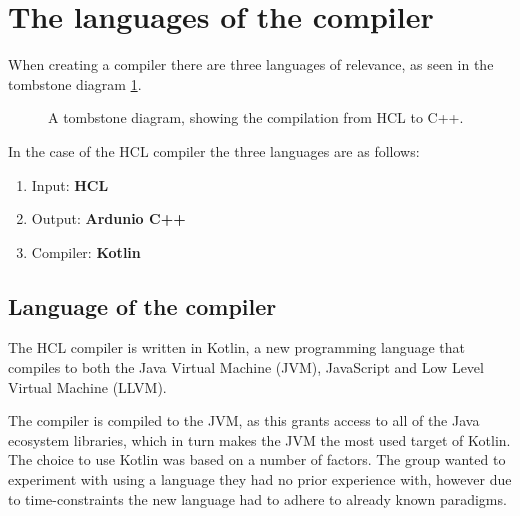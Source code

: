\section{The languages of the compiler}
\label{langsOfCompiler}
When creating a compiler there are three languages of relevance, as seen in the tombstone diagram \ref{fig:TStoneOnlyHCL}.

\begin{figure}[H]
	\centering
	\caption{
		A tombstone diagram, showing the compilation from HCL to C++\cite{TStoneWiki}.
	}
	\label{fig:TStoneOnlyHCL}
\end{figure}
In the case of the HCL compiler the three languages are as follows:

\begin{enumerate}
\item Input: \textbf{HCL} \\
\item Output: \textbf{Ardunio C++} \\
\item Compiler: \textbf{Kotlin} \\
\end{enumerate}

\subsection{Language of the compiler}
The HCL compiler is written in Kotlin\cite{KotlinWebsite}, a new programming language that compiles to both the Java Virtual Machine (JVM), JavaScript and Low Level Virtual Machine (LLVM).

The compiler is compiled to the JVM, as this grants access to all of the Java ecosystem libraries, which in turn makes the JVM the most used target of Kotlin.
The choice to use Kotlin was based on a number of factors.
The group wanted to experiment with using a language they had no prior experience with, however due to time-constraints the new language had to adhere to already known paradigms.

